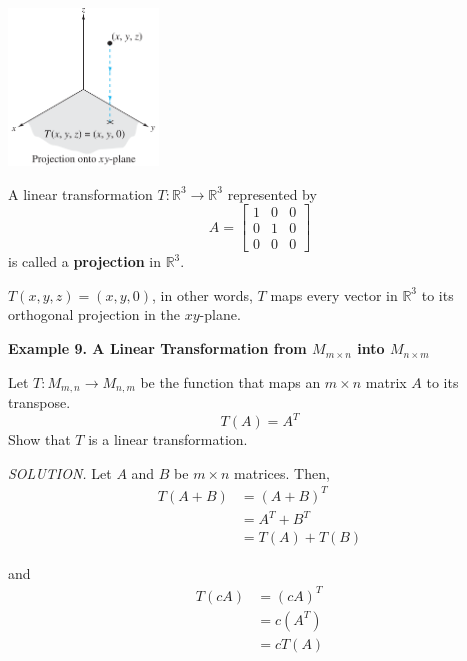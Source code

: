 \documentclass{article}
\newcommand\x{\times}
\newcommand\R{\mathbb{R}}
\begin{document}
    \begin{minipage}{0.3\linewidth}
        \includegraphics[width = 4cm]{images/proj3d.png}
    \end{minipage}
    \begin{minipage}{0.6\linewidth}
        A linear transformation $T: \R^3 \to \R^3$ represented by
        \[A = \begin{bmatrix}
            1 & 0 & 0\\
            0 & 1 & 0\\
            0 & 0 & 0
        \end{bmatrix}\]
    is called a \textbf{projection} in $\R^3$.

    $T(x,y,z) = (x,y,0)$, in other words, $T$ maps every vector in $\R^3$ to its orthogonal
    projection in the $xy$-plane.
    \end{minipage}

    \textbf{Example 9. \textcolor{blue5}{A Linear Transformation from $M_{m\x n}$ into $M_{n\x m}$}}

    Let $T: M _{m ,n} \to M _{n,m}$ be the function that maps an $m \x n$ matrix $A$ to its transpose.
    \[T(A)   = A^T\]
    Show that $T$ is a linear transformation.

    \textit{ \textcolor{blue5}{SOLUTION.} } Let $A$ and $B$ be  $m \times n$ matrices. Then,
    \begin{equation*}
        \begin{split}
            T(A + B) &= (A + B)^T \\
                     &= A^T + B^T \\
                     &= T(A) + T(B)
        \end{split}
    \end{equation*}

    and
    \begin{equation*}
        \begin{split}
            T(cA) &= (cA)^T \\
                  &= c(A^T) \\
                  &= cT(A)
        \end{split}
    \end{equation*}
    
\end{document}
